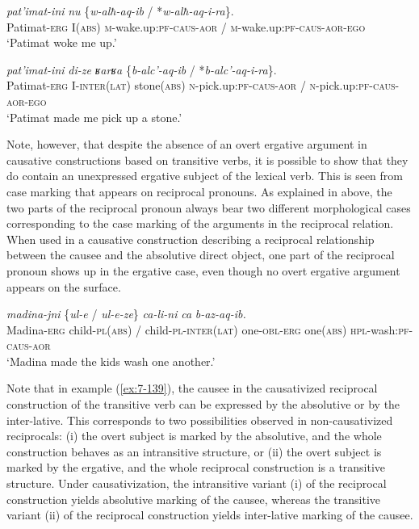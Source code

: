 ﻿\documentclass[output=paper]{langsci/langscibook}
\begin{document}
\ex %
\gll \emph{pat'imat-ini} \emph{nu} \{\emph{w-alħ-aq-ib} / *\emph{w-alħ-aq-i-ra}\}.\\
Patimat-\textsc{erg} I(\textsc{abs}) \textsc{m}-wake.up:\textsc{pf}-\textsc{caus}-\textsc{aor} / \textsc{m}-wake.up:\textsc{pf}-\textsc{caus}-\textsc{aor}-\textsc{ego}\\
\glt `Patimat woke me up.'

\ex %
\gll \emph{pat'imat-ini} \emph{di-ze} \emph{ʁarʁa} \{\emph{b-alc'-aq-ib} / *\emph{b-alc'-aq-i-ra}\}.\\
Patimat-\textsc{erg} I-\textsc{inter(lat)} stone(\textsc{abs}) \textsc{n}-pick.up:\textsc{pf}-\textsc{caus}-\textsc{aor} / \textsc{n}-pick.up:\textsc{pf}-\textsc{caus}-\textsc{aor}-\textsc{ego}\\
\glt `Patimat made me pick up a stone.'
\z

Note, however, that despite the absence of an overt ergative argument in
causative constructions based on transitive verbs, it is possible to
show that they do contain an unexpressed ergative subject of the lexical
verb. This is seen from case marking that appears on reciprocal
pronouns. As explained in  above, the two parts of the
reciprocal pronoun always bear two different morphological cases
corresponding to the case marking of the arguments in the reciprocal
relation. When used in a causative construction describing a reciprocal
relationship between the causee and the absolutive direct object, one
part of the reciprocal pronoun shows up in the ergative case, even
though no overt ergative argument appears on the surface.

\pagebreak

\ea \label{ex:7-139}
\gll \emph{madina-jni} \{\emph{ul-e} / \emph{ul-e-ze}\} \emph{ca-li-ni} \emph{ca} \emph{b-az-aq-ib.}\\
Madina-\textsc{erg} child-\textsc{pl}(\textsc{abs}) / child-\textsc{pl}-\textsc{inter(lat)} one-\textsc{obl}-\textsc{erg} one(\textsc{abs}) \textsc{hpl}-wash:\textsc{pf}-\textsc{caus}-\textsc{aor}\\
\glt `Madina made the kids wash one another.'
\z

Note that in example (\ref{ex:7-139}), the causee in the causativized reciprocal
construction of the transitive verb can be expressed by the absolutive
or by the inter-lative. This corresponds to two possibilities observed
in non-causativized reciprocals: (i) the overt subject is marked by the
absolutive, and the whole construction behaves as an intransitive
structure, or (ii) the overt subject is marked by the ergative, and the
whole reciprocal construction is a transitive structure. Under
causativization, the intransitive variant (i) of the reciprocal
construction yields absolutive marking of the causee, whereas the
transitive variant (ii) of the reciprocal construction yields 
inter-lative marking of the causee.
\end{document}
